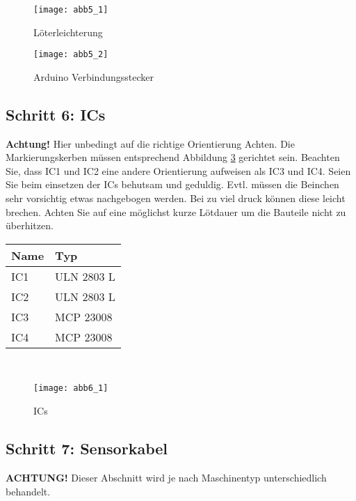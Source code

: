 \documentclass[fleqn,10pt]{SelfArx} %
\begin{document}
\begin{figure}[tbhp]\centering
\texttt{[image: abb5\_1]}
\caption{Löterleichterung}
\label{fig:abb5_1}
\end{figure}

\begin{figure}[tbhp]\centering
\texttt{[image: abb5\_2]}
\caption{Arduino Verbindungsstecker}
\label{fig:abb5_2}
\end{figure}

\FloatBarrier

 \subsection*{Schritt 6: ICs}

\textbf{Achtung!} Hier unbedingt auf die richtige Orientierung Achten. Die Markierungskerben müssen entsprechend Abbildung \ref{fig:abb6_1} gerichtet sein. Beachten Sie, dass IC1 und IC2 eine andere Orientierung aufweisen als IC3 und IC4. Seien Sie beim einsetzen der ICs behutsam und geduldig. Evtl. müssen die Beinchen sehr vorsichtig etwas nachgebogen werden. Bei zu viel druck können diese leicht brechen. Achten Sie auf eine möglichst kurze Lötdauer um die Bauteile nicht zu überhitzen.\\
\begin{tabular}{ll}
\hline
\textbf{Name} & \textbf{Typ} \\ \hline
IC1           & ULN 2803 L   \\ \hline
IC2           & ULN 2803 L   \\ \hline
IC3           & MCP 23008    \\ \hline
IC4           & MCP 23008    \\ \hline
\end{tabular}\\

\begin{figure}[tbhp]\centering
\texttt{[image: abb6\_1]}
\caption{ICs}
\label{fig:abb6_1}
\end{figure}

\FloatBarrier

 \subsection*{Schritt 7: Sensorkabel}

\textbf{ACHTUNG!} Dieser Abschnitt wird je nach Maschinentyp unterschiedlich behandelt.\\
\end{document}

